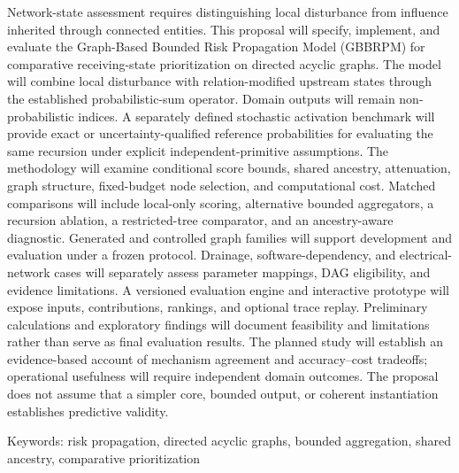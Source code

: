 {}
\vspace{3\baselineskip}
\noindent Network-state assessment requires distinguishing local disturbance from influence inherited through connected entities. This proposal will specify, implement, and evaluate the Graph-Based Bounded Risk Propagation Model (GBBRPM) for comparative receiving-state prioritization on directed acyclic graphs. The model will combine local disturbance with relation-modified upstream states through the established probabilistic-sum operator. Domain outputs will remain non-probabilistic indices. A separately defined stochastic activation benchmark will provide exact or uncertainty-qualified reference probabilities for evaluating the same recursion under explicit independent-primitive assumptions. The methodology will examine conditional score bounds, shared ancestry, attenuation, graph structure, fixed-budget node selection, and computational cost. Matched comparisons will include local-only scoring, alternative bounded aggregators, a recursion ablation, a restricted-tree comparator, and an ancestry-aware diagnostic. Generated and controlled graph families will support development and evaluation under a frozen protocol. Drainage, software-dependency, and electrical-network cases will separately assess parameter mappings, DAG eligibility, and evidence limitations. A versioned evaluation engine and interactive prototype will expose inputs, contributions, rankings, and optional trace replay. Preliminary calculations and exploratory findings will document feasibility and limitations rather than serve as final evaluation results. The planned study will establish an evidence-based account of mechanism agreement and accuracy--cost tradeoffs; operational usefulness will require independent domain outcomes. The proposal does not assume that a simpler core, bounded output, or coherent instantiation establishes predictive validity.

\vspace{\baselineskip}
\noindent Keywords: risk propagation, directed acyclic graphs, bounded aggregation, shared ancestry, comparative prioritization
